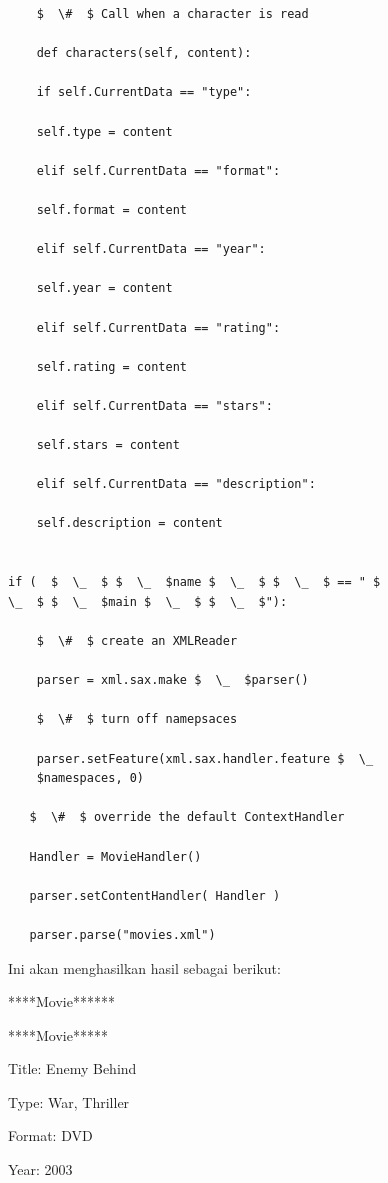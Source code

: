 \begin{verbatim}
    $  \#  $ Call when a character is read 
 
    def characters(self, content): 
 
    if self.CurrentData == "type": 
 
    self.type = content 
 
    elif self.CurrentData == "format": 
 
    self.format = content 
 
    elif self.CurrentData == "year": 
 
    self.year = content 
 
    elif self.CurrentData == "rating": 
 
    self.rating = content 
 
    elif self.CurrentData == "stars": 
 
    self.stars = content 
 
    elif self.CurrentData == "description": 
 
    self.description = content 
 
 
if (  $  \_  $ $  \_  $name $  \_  $ $  \_  $ == " $ 
\_  $ $  \_  $main $  \_  $ $  \_  $"): 
 
    $  \#  $ create an XMLReader 
 
    parser = xml.sax.make $  \_  $parser() 
 
    $  \#  $ turn off namepsaces 
 
    parser.setFeature(xml.sax.handler.feature $  \_  
    $namespaces, 0) 

   $  \#  $ override the default ContextHandler 
 
   Handler = MovieHandler() 
 
   parser.setContentHandler( Handler )   
 
   parser.parse("movies.xml") 
\end{verbatim}
\vspace{12pt}
 
Ini akan menghasilkan hasil sebagai berikut: 
 
{\fontsize{10pt}{10pt}\selectfont *****Movie******} 
 
{\fontsize{10pt}{10pt}\selectfont *****Movie*****} 
 
{\fontsize{10pt}{10pt}\selectfont Title: Enemy Behind} 
 
{\fontsize{10pt}{10pt}\selectfont Type: War, Thriller} 
 
{\fontsize{10pt}{10pt}\selectfont Format: DVD} 
 
{\fontsize{10pt}{10pt}\selectfont Year: 2003} 
 
